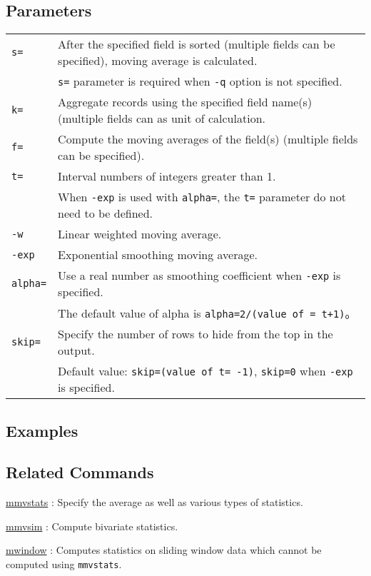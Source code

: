 \subsection*{Parameters}
\begin{table}[htbp]
{\small
\begin{tabular}{ll}
\verb|s=|    & After the specified field is sorted (multiple fields can be specified), moving average is calculated. \\
             & \verb|s=| parameter is required when \verb|-q| option is not specified. \\
\verb|k=|    & Aggregate records using the specified field name(s) (multiple fields can as unit of calculation. \\
\verb|f=|    & Compute the moving averages of the field(s) (multiple fields can be specified). \\
\verb|t=|    & Interval numbers of integers greater than 1.  \\
             & When \verb|-exp| is used with \verb|alpha=|, the \verb|t=| parameter do not need to be defined. \\
\verb|-w|    & Linear weighted moving average.\\
\verb|-exp|  & Exponential smoothing moving average. \\
\verb|alpha=|& Use a real number as smoothing coefficient when \verb|-exp| is specified. \\
             & The default value of alpha is \verb|alpha=2/(value of = t+1)|。\\
\verb|skip=| & Specify the number of rows to hide from the top in the output. \\
             & Default value: \verb|skip=(value of t= -1)|, \verb|skip=0| when \verb|-exp| is specified.  \\
\end{tabular} 
}
\end{table} 


\subsection*{Examples}

\subsection*{Related Commands}
\hyperref[sect:mmvstats] {mmvstats} : Specify the average as well as various types of statistics. 

\hyperref[sect:mmvsim] {mmvsim} : Compute bivariate statistics. 

\hyperref[sect:mwindow] {mwindow} : Computes statistics on sliding window data which cannot be computed using \verb|mmvstats|. 

%
